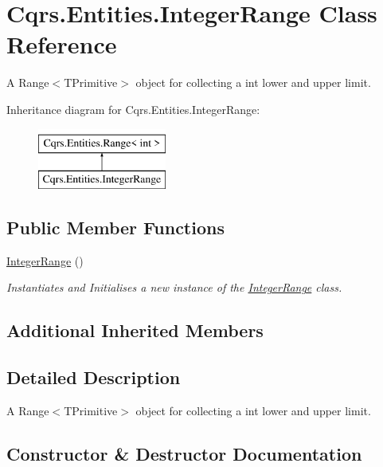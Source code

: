 \hypertarget{classCqrs_1_1Entities_1_1IntegerRange}{}\section{Cqrs.\+Entities.\+Integer\+Range Class Reference}
\label{classCqrs_1_1Entities_1_1IntegerRange}


A Range$<$\+T\+Primitive$>$ object for collecting a int lower and upper limit.  


Inheritance diagram for Cqrs.\+Entities.\+Integer\+Range\+:\begin{figure}[H]
\begin{center}
\leavevmode
\includegraphics[height=2.000000cm]{classCqrs_1_1Entities_1_1IntegerRange}
\end{center}
\end{figure}
\subsection*{Public Member Functions}
\begin{DoxyCompactItemize}
\item 
\hyperlink{classCqrs_1_1Entities_1_1IntegerRange_ac491ceda1f36d73025011d79e56d77d3_ac491ceda1f36d73025011d79e56d77d3}{Integer\+Range} ()
\begin{DoxyCompactList}\small\item\em Instantiates and Initialises a new instance of the \hyperlink{classCqrs_1_1Entities_1_1IntegerRange}{Integer\+Range} class. \end{DoxyCompactList}\end{DoxyCompactItemize}
\subsection*{Additional Inherited Members}


\subsection{Detailed Description}
A Range$<$\+T\+Primitive$>$ object for collecting a int lower and upper limit. 



\subsection{Constructor \& Destructor Documentation}
\mbox{\label{classCqrs_1_1Entities_1_1IntegerRange_ac491ceda1f36d73025011d79e56d77d3_ac491ceda1f36d73025011d79e56d77d3}} 
